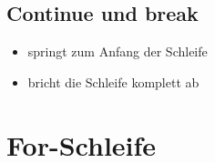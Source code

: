\livecoding

\subsection{Continue und break}
\begin{frame}
	\slidehead

	\begin{itemize}
		\item {} springt zum Anfang der Schleife
		\item {} bricht die Schleife komplett ab
	\end{itemize}
\end{frame}

\livecoding


\section{For-Schleife}
\subtitle{Kapitel 4: Befehle wiederholen}


